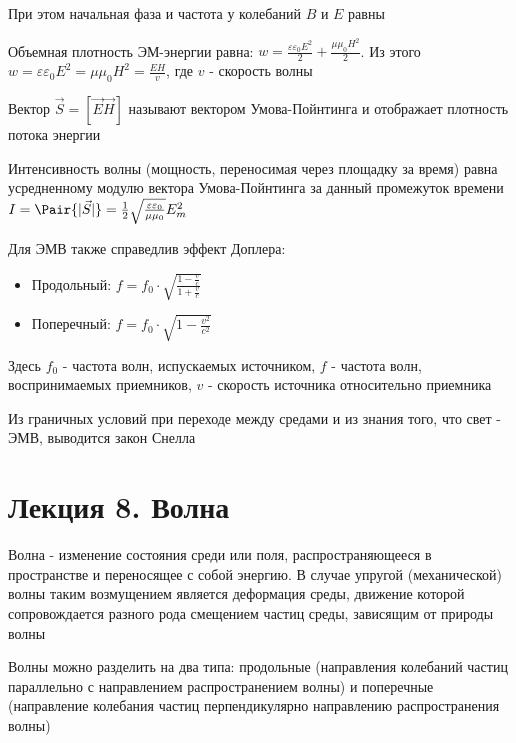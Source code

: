 \documentclass[12pt]{article}
\begin{document}
При этом начальная фаза и частота у колебаний $B$ и $E$ равны

Объемная плотность ЭМ-энергии равна: $w = \frac{\varepsilon \varepsilon_0 E^2}{2} + \frac{\mu \mu_0 H^2}{2}$. 
Из этого $w = \varepsilon \varepsilon_0 E^2 = \mu \mu_0 H^2 = \frac{EH}{v}$, где $v$ - скорость волны

Вектор $\vec S = [\vec E \vec H]$ называют вектором Умова-Пойнтинга и отображает плотность потока энергии 

Интенсивность волны (мощность, переносимая через площадку за время) равна усредненному модулю вектора Умова-Пойнтинга за данный промежуток времени $I = \Pair{|\vec S|} = \frac{1}{2} \sqrt{\frac{\varepsilon \varepsilon_0}{\mu \mu_0}} E^2_m$

Для ЭМВ также справедлив эффект Доплера:

\begin{itemize}
    \item Продольный: $f = f_0 \cdot \sqrt{\frac{1 - \frac{v}{c}}{1 + \frac{v}{c}}}$

    \item Поперечный: $f = f_0 \cdot \sqrt{1 - \frac{v^2}{c^2}}$
\end{itemize}

Здесь $f_0$ - частота волн, испускаемых источником, $f$ - частота волн, воспринимаемых приемников, $v$ - скорость источника относительно приемника

Из граничных условий при переходе между средами и из знания того, что свет - ЭМВ, выводится закон Снелла 








\section{Лекция 8. Волна}

Волна - изменение состояния среди или поля, распространяющееся в пространстве и переносящее с собой энергию.
В случае упругой (механической) волны таким возмущением является деформация среды, движение которой сопровождается
разного рода смещением частиц среды, зависящим от природы волны

Волны можно разделить на два типа: продольные (направления колебаний частиц параллельно с направлением распространением волны) 
и поперечные (направление колебания частиц перпендикулярно направлению распространения волны)
\end{document}
